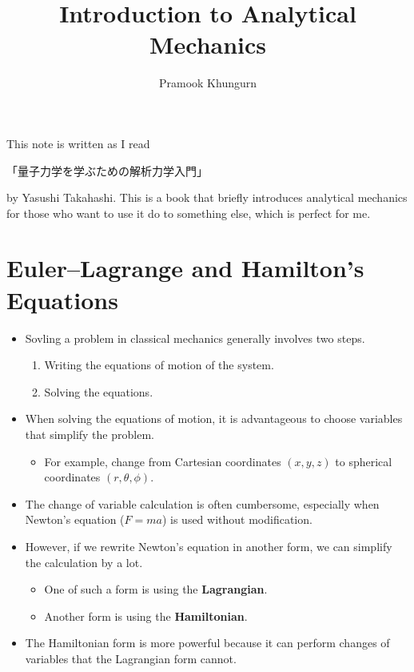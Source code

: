\documentclass[10pt]{article}
\title{Introduction to Analytical Mechanics}
\author{Pramook Khungurn}
\begin{document}
  \maketitle

  This note is written as I read \begin{CJK}{UTF8}{min}「量子力学を学ぶための解析力学入門」\end{CJK} by Yasushi Takahashi. This is a book that briefly introduces analytical mechanics for those who want to use it do to something else, which is perfect for me.

  \section{Euler--Lagrange and Hamilton's Equations}

  \begin{itemize}
  	\item Sovling a problem in classical mechanics generally involves two steps.
  	\begin{enumerate}
  		\item Writing the equations of motion of the system.
  		\item Solving the equations.
  	\end{enumerate}

  	\item When solving the equations of motion, it is advantageous to choose variables that simplify the problem.
  	\begin{itemize}
  		\item For example, change from Cartesian coordinates $(x,y,z)$ to spherical coordinates $(r,\theta,\phi)$.
  	\end{itemize}

  	\item The change of variable calculation is often cumbersome, especially when Newton's equation ($F = ma$) is used without modification.

  	\item However, if we rewrite Newton's equation in another form, we can simplify the calculation by a lot.
  	\begin{itemize}
  		\item One of such a form is using the {\bf Lagrangian}.
  		\item Another form is using the {\bf Hamiltonian}.
  	\end{itemize}

  	\item The Hamiltonian form is more powerful because it can perform changes of variables that the Lagrangian form cannot.
  \end{itemize}
\end{document}
